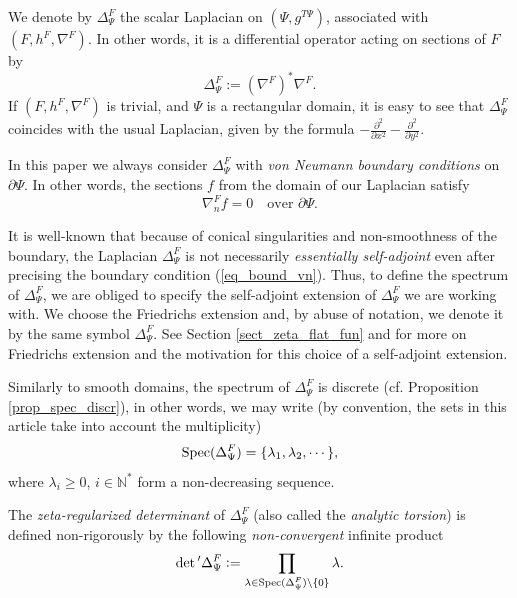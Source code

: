 \documentclass[12pt]{article}
\numberwithin{equation}{section}
\theoremstyle{theorem}
\theoremstyle{definition}
\theoremstyle{remark}
\newcommand{\nat}{\mathbb{N}}
\newcommand{\spec}{{\rm{Spec}}}
\newcommand{\laplcomp}{\Delta}
\begin{document}
	We denote by $\laplcomp_{\Psi}^{F}$ the scalar Laplacian on $(\Psi, g^{T\Psi})$, associated with $(F, h^F, \nabla^F)$. 
	In other words, it is a differential operator acting on sections of $F$ by
	\begin{equation}\label{eq_lapl}
		\laplcomp_{\Psi}^{F} := (\nabla^F)^* \nabla^F.
	\end{equation}
	If $(F, h^{F}, \nabla^{F})$ is trivial, and $\Psi$ is a rectangular domain, it is easy to see that $\laplcomp_{\Psi}^{F}$ coincides with the usual Laplacian, given by the formula $- \frac{\partial^2}{\partial x^2} - \frac{\partial^2}{\partial y^2}$.
	\par 
	In this paper we always consider $\laplcomp_{\Psi}^{F}$ with \textit{von Neumann boundary conditions} on $\partial \Psi$. In other words, the sections $f$ from the domain of our Laplacian satisfy
	\begin{equation}\label{eq_bound_vn}
		\nabla^{F}_{n} f = 0 \quad \text{over } \partial \Psi. 
	\end{equation}
	\par It is well-known that because of conical singularities and non-smoothness of the boundary, the Laplacian $\laplcomp_{\Psi}^{F}$ is not necessarily \textit{essentially self-adjoint} even after precising the boundary condition (\ref{eq_bound_vn}). 	
	Thus, to define the spectrum of $\laplcomp_{\Psi}^{F}$, we are obliged to specify the self-adjoint extension of $\laplcomp_{\Psi}^{F}$ we are working with.
	We choose the Friedrichs extension and, by abuse of notation, we denote it by the same symbol $\laplcomp_{\Psi}^{F}$. See Section \ref{sect_zeta_flat_fun} and \cite{FinFinDiffer} for more on Friedrichs extension and the motivation for this choice of a self-adjoint extension.
	\par 
	Similarly to smooth domains, the spectrum of $\laplcomp_{\Psi}^{F}$ is discrete (cf. Proposition \ref{prop_spec_discr}), in other words, we may write (by convention, the sets in this article take into account the multiplicity)
	\begin{equation}\label{eq_spec_lapl_defn}
		\spec(\laplcomp_{\Psi}^{F}) = \{ \lambda_1, \lambda_2, \cdots \},
	\end{equation}
	where $\lambda_i \geq 0$, $i \in \nat^*$ form a non-decreasing sequence.
	\par 
	 The \textit{zeta-regularized determinant} of $\laplcomp_{\Psi}^{F}$ (also called the \textit{analytic torsion}) is defined non-rigorously by the following \textit{non-convergent} infinite product
	 \begin{equation}\label{defn_an_tors}
	 	\det{}' \laplcomp_{\Psi}^{F} := \prod_{\lambda \in \spec(\laplcomp_{\Psi}^{F}) \setminus \{ 0 \}} \lambda.
	 \end{equation}
\end{document}
